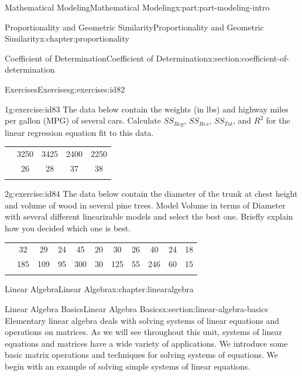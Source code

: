 \documentclass[oneside,10pt,]{book}
\newcommand{\tabularfont}{\relax}
\numberwithin{equation}{section}
\newcommand{\hrulethin}  {\noalign{\hrule height 0.04em}}
\newcommand{\hrulethick} {\noalign{\hrule height 0.11em}}
\begin{document}
\begin{partptx}{Mathematical Modeling}{}{Mathematical Modeling}{}{}{x:part:part-modeling-intro}
\begin{chapterptx}{Proportionality and Geometric Similarity}{}{Proportionality and Geometric Similarity}{}{}{x:chapter:proportionality}
\begin{sectionptx}{Coefficient of Determination}{}{Coefficient of Determination}{}{}{x:section:coefficient-of-determination}
\begin{exercises-subsection}{Exercises}{}{Exercises}{}{}{g:exercises:id82}
\begin{divisionexercise}{1}{}{}{g:exercise:id83}%
The data below contain the weights (in lbs) and highway miles per gallon (MPG) of several cars. Calculate \(SS_{Reg}\), \(SS_{Res}\), \(SS_{Tot}\), and \(R^2\) for the linear regression equation fit to this data.%
\begin{center}%
{\tabularfont%
\begin{tabular}{ccccc}\hrulethick
\multicolumn{1}{cA}{\emph{Weight} (\(x\))}&3250&3425&2400&2250\tabularnewline\hrulethin
\multicolumn{1}{cA}{\emph{MPG} (\(y\))}&26&28&37&38\tabularnewline\hrulethick
\end{tabular}
}%
\end{center}%
\end{divisionexercise}%
\begin{divisionexercise}{2}{}{}{g:exercise:id84}%
The data below contain the diameter of the trunk at chest height and volume of wood in several pine trees. Model Volume in terms of Diameter with several different linearizable models and select the best one. Briefly explain how you decided which one is best.%
\begin{center}%
{\tabularfont%
\begin{tabular}{rcccccccccc}\hrulethick
\multicolumn{1}{rA}{\emph{Diameter}}&32&29&24&45&20&30&26&40&24&18\tabularnewline\hrulethin
\multicolumn{1}{rA}{\emph{Volume}}&185&109&95&300&30&125&55&246&60&15\tabularnewline\hrulethick
\end{tabular}
}%
\end{center}%
\end{divisionexercise}%
\end{exercises-subsection}
\end{sectionptx}
\end{chapterptx}
%
\typeout{************************************************}
\typeout{************************************************}
%
\begin{chapterptx}{Linear Algebra}{}{Linear Algebra}{}{}{x:chapter:linearalgebra}
%
%
\typeout{************************************************}
\typeout{************************************************}
%
\begin{sectionptx}{Linear Algebra Basics}{}{Linear Algebra Basics}{}{}{x:section:linear-algebra-basics}
Elementary linear algebra deals with solving systems of linear equations and operations on matrices. As we will see throughout this unit, systems of linear equations and matrices have a wide variety of applications. We introduce some basic matrix operations and techniques for solving systems of equations. We begin with an example of solving simple systems of linear equations.%

\end{sectionptx}
\end{chapterptx}
\end{partptx}
\end{document}
